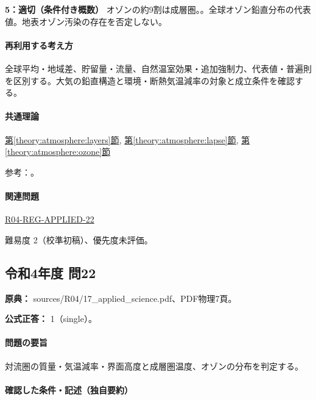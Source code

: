 \noindent\textbf{5：適切（条件付き概数）} オゾンの約9割は成層圏。。全球オゾン鉛直分布の代表値。地表オゾン汚染の存在を否定しない。\par

\paragraph{再利用する考え方} 全球平均・地域差、貯留量・流量、自然温室効果・追加強制力、代表値・普遍則を区別する。大気の鉛直構造と環境・断熱気温減率の対象と成立条件を確認する。

\paragraph{共通理論} \hyperref[theory:atmosphere:layers]{第\ref*{theory:atmosphere:layers}節}, \hyperref[theory:atmosphere:lapse]{第\ref*{theory:atmosphere:lapse}節}, \hyperref[theory:atmosphere:ozone]{第\ref*{theory:atmosphere:ozone}節}

\par 参考：\cite{atm_noaa_layers,atm_us1976,atm_jma_ozone}。

\paragraph{関連問題} \hyperref[q:r04-reg-applied-22]{R04-REG-APPLIED-22}

\par 難易度 2（校準初稿）、優先度未評価。

\subsection{令和4年度 問22}
\label{q:r04-reg-applied-22}

\noindent\textbf{原典：} sources/R04/17\_applied\_science.pdf、PDF物理7頁。

\textbf{公式正答：} 1（single）。

\paragraph{問題の要旨} 対流圏の質量・気温減率・界面高度と成層圏温度、オゾンの分布を判定する。

\paragraph{確認した条件・記述（独自要約）}\mbox{}\par

